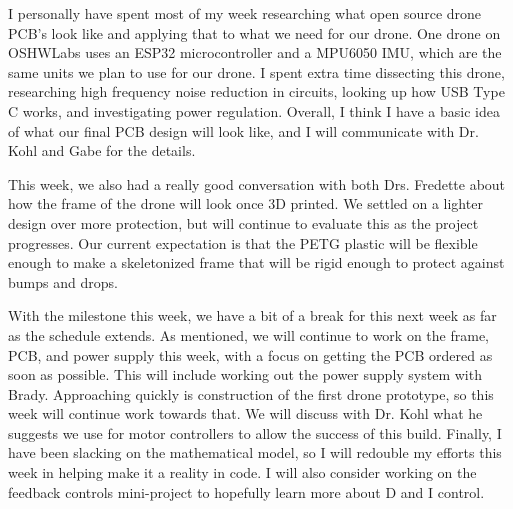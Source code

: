 \documentclass[12pt, titlepage]{article}
\begin{document}
I personally have spent most of my week researching what open source drone PCB's look like and applying that to what we need for our drone. One drone on OSHWLabs uses an ESP32 microcontroller and a MPU6050 IMU, which are the same units we plan to use for our drone. I spent extra time dissecting this drone, researching high frequency noise reduction in circuits,  looking up how USB Type C works, and investigating power regulation. Overall, I think I have a basic idea of what our final PCB design will look like, and I will communicate with Dr. Kohl and Gabe for the details. 

This week, we also had a really good conversation with both Drs. Fredette about how the frame of the drone will look once 3D printed. We settled on a lighter design over more protection, but will continue to evaluate this as the project progresses. Our current expectation is that the PETG plastic will be flexible enough to make a skeletonized frame that will be rigid enough to protect against bumps and drops.

With the milestone this week, we have a bit of a break for this next week as far as the schedule extends. As mentioned, we will continue to work on the frame, PCB, and power supply this week, with a focus on getting the PCB ordered as soon as possible. This will include working out the power supply system with Brady. Approaching quickly is construction of the first drone prototype, so this week will continue work towards that. We will discuss with Dr. Kohl what he suggests we use for motor controllers to allow the success of this build. Finally, I have been slacking on the mathematical model, so I will redouble my efforts this week in helping make it a reality in code. I will also consider working on the feedback controls mini-project to hopefully learn more about D and I control.
\end{document}
